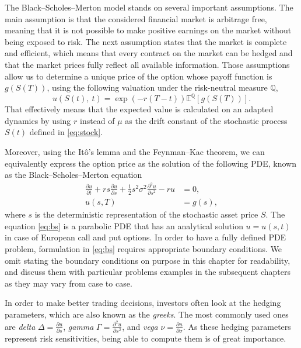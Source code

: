\documentclass{UUThesisTemplate}
\begin{document}
\par
The Black--Scholes--Merton model stands on several important assumptions. The main assumption is that the considered financial market is arbitrage free, meaning that it is not possible to make positive earnings on the market without being exposed to risk. The next assumption states that the market is complete and efficient, which means that every contract on the market can be hedged and that the market prices fully reflect all available information. Those assumptions allow us to determine a unique price of the option whose payoff function is $g(S(T))$, using the following valuation under the risk-neutral measure $\mathbb{Q}$,
\begin{equation}
\label{eq:mc}
u(S(t),\ t)=\exp\left(-r(T-t)\right)\mathbb{E}^{\mathbb{Q}}\left[g(S(T))\right].
\end{equation}
That effectively means that the expected value is calculated on an adapted dynamics by using $r$ instead of $\mu$ as the drift constant of the stochastic process $S(t)$ defined in \eqref{eq:stock}. 

\par
Moreover, using the It\^o's lemma and the Feynman--Kac theorem, we can equivalently express the option price as the solution of the following PDE, known as the Black--Scholes--Merton equation
\begin{align}
\frac{\partial u}{\partial t} + r s \frac{\partial u} {\partial s} + \frac{1}{2} s^2 \sigma^2 \frac{\partial^2 u}{\partial s^2} - r u &= 0, \nonumber \\
u(s,T) &= g(s), \label{eq:bs}
\end{align}
where $s$ is the deterministic representation of the stochastic asset price $S$. The equation \eqref{eq:bs} is a parabolic PDE that has an analytical solution $u=u(s,t)$ in case of European call and put options. In order to have a fully defined PDE problem, formulation in \eqref{eq:bs} requires appropriate boundary conditions. We omit stating the boundary conditions on purpose in this chapter for readability, and discuss them with particular problems examples in the subsequent chapters as they may vary from case to case. %

\par
In order to make better trading decisions, investors often look at the hedging parameters, which are also known as the \emph{greeks}. The most commonly used ones are \emph{delta} $\Delta = \frac{\partial u}{\partial s}$, \emph{gamma} $\Gamma = \frac{\partial^2 u}{\partial s^2}$, and \emph{vega} $\nu = \frac{\partial u}{\partial \sigma}$. As these hedging parameters represent risk sensitivities, being able to compute them is of great importance.
\end{document}
